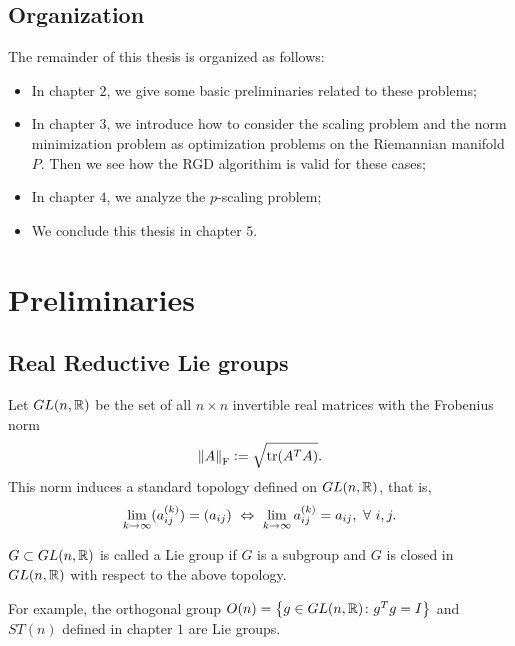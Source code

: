 \documentclass[suri,pdfbookmark]{engsuribt} %
\begin{document}
  \section{Organization}

  The remainder of this thesis is organized as follows:
  \begin{itemize}
    \item In chapter $2$, we give some basic preliminaries related to these problems;
    \item In chapter $3$, we introduce how to consider the scaling problem and the norm minimization problem as optimization problems on the Riemannian manifold $P$. Then we see how the RGD algorithim is valid for these cases;
    \item In chapter $4$, we analyze the $p$-scaling problem;
    \item We conclude this thesis in chapter $5$.
  \end{itemize}



  \chapter{Preliminaries}

  \section{Real Reductive Lie groups}

  Let $GL(n,\mathbb{R})$ be the set of all $n \times n$ invertible real matrices with the Frobenius norm
  \begin{equation*}
    \left\lVert A\right\lVert_{\operatorname{F}} \vcentcolon= \sqrt{\operatorname{tr}(A^TA)}.
  \end{equation*}
  This norm induces a standard topology defined on $GL(n,\mathbb{R})$, that is,
  \begin{equation*}
    \lim_{k \rightarrow \infty} (a_{ij}^{(k)}) = (a_{ij}) ~\Leftrightarrow~ \lim_{k \rightarrow \infty} a_{ij}^{(k)} = a_{ij},~\forall~i,j.
  \end{equation*}
  \begin{defn}
    $G \subset GL(n,\mathbb{R})$ is called a Lie group if $G$ is a subgroup and $G$ is closed in $GL(n,\mathbb{R})$ with respect to the above topology.
  \end{defn}
  For example, the orthogonal group $O(n) = \left\{g \in GL(n,\mathbb{R}) \colon g^Tg  = I\right\}$ and $ST(n)$ defined in chapter $1$ are Lie groups.
\end{document}

